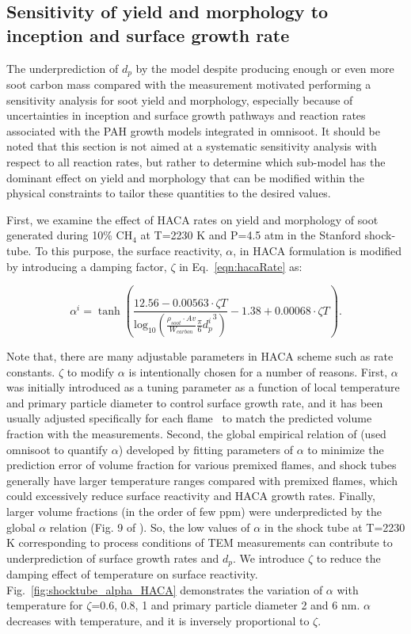 \subsection{Sensitivity of yield and morphology to inception and surface growth rate}

The underprediction of $d_p$ by the model despite producing enough or even more soot carbon mass compared with the measurement motivated performing a sensitivity analysis for soot yield and morphology, especially because of uncertainties in inception and surface growth pathways and reaction rates associated with the PAH growth models integrated in omnisoot. It should be noted that this section is not aimed at a systematic sensitivity analysis with respect to all reaction rates, but rather to determine which sub-model has the dominant effect on yield and morphology that can be modified within the physical constraints to tailor these quantities to the desired values.

First, we examine the effect of HACA rates on yield and morphology of soot generated during 10\% $\mathrm{CH_4}$ at T=2230 K and P=4.5 atm in the Stanford shock-tube. To this  purpose, the surface reactivity, $\alpha$, in HACA formulation is modified by introducing a damping factor, $\zeta$ in Eq.~\eqref{eqn:hacaRate} as:

\begin{equation}
	\alpha^i = \tanh 
	\left(
	\frac{12.56 - 0.00563\cdot \zeta T}
	{\mbox{log}_{10}
		\left( \frac{\rho_{soot}\cdot Av}{W_{carbon}} \frac{\pi}{6}{d^i_p}^3 \right) } -1.38+0.00068\cdot \zeta T
	\right)
	\label{eqn:alpha_modified}.
\end{equation}

Note that, there are many adjustable parameters in HACA scheme such as rate constants. $\zeta$ to modify $\alpha$ is intentionally chosen for a number of reasons. First, $\alpha$ was initially introduced as a tuning parameter as a function of local temperature and primary particle diameter to control surface growth rate, and it has been usually adjusted specifically for each flame~\citep{castaldi1996pah, xu1997soot} to match the predicted volume fraction with the measurements. Second, the global empirical relation of \citet{appel2000kinetic} (used omnisoot to quantify $\alpha$) developed by fitting parameters of $\alpha$ to minimize the prediction error of volume fraction for various premixed flames, and shock tubes generally have larger temperature ranges compared with premixed flames, which could excessively reduce surface reactivity and HACA growth rates. Finally, larger volume fractions (in the order of few ppm) were underpredicted by the global $\alpha$ relation (Fig. 9 of \citep{appel2000kinetic}). So, the low values of $\alpha$ in the shock tube at T=2230 K corresponding to process conditions of TEM measurements can contribute to underprediction of surface growth rates and $d_p$. We introduce $\zeta$ to reduce the damping effect of temperature on surface reactivity. Fig.~\ref{fig:shocktube_alpha_HACA} demonstrates the variation of $\alpha$ with temperature for $\zeta$=0.6, 0.8, 1 and primary particle diameter 2 and 6 nm. $\alpha$ decreases with temperature, and it is inversely proportional to $\zeta$. 

